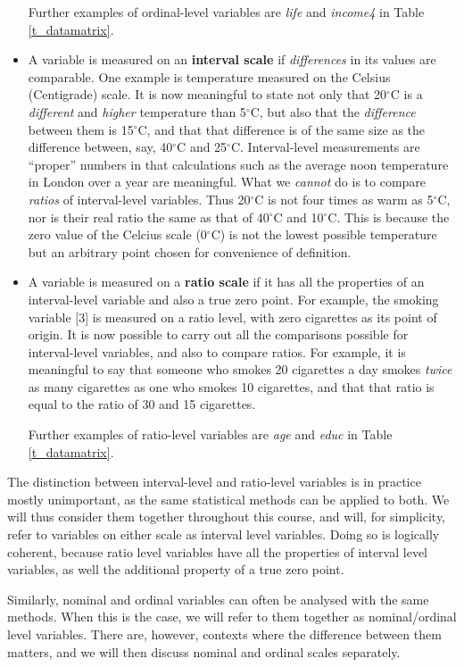\begin{itemize}
Further examples of ordinal-level variables are
\emph{life} and \emph{income4} in Table \ref{t_datamatrix}.
\item
A variable is measured on an
\textbf{interval scale} if \emph{differences} in its values are
comparable. One example is temperature measured on the Celsius
(Centigrade) scale. It is now meaningful to state not only that
20$^{\circ}$C is a \emph{different} and \emph{higher} temperature than
5$^{\circ}$C, but also that the \emph{difference} between them is
15$^{\circ}$C, and that that difference is of the same size as the
difference between, say, 40$^{\circ}$C and 25$^{\circ}$C. Interval-level
measurements are ``proper'' numbers in that calculations such as the
average noon temperature in London over a year are meaningful. What we
\emph{cannot} do is to compare \emph{ratios} of interval-level
variables. Thus 20$^{\circ}$C is not four times as warm as 5$^{\circ}$C,
nor is their real ratio the same as that of 40$^{\circ}$C and
10$^{\circ}$C. This is because the zero value of the Celcius scale
(0$^{\circ}$C) is not the lowest possible temperature but
an arbitrary point chosen for convenience of definition.
\item
A variable is measured on a \textbf{ratio scale} if it has all the
properties of an interval-level variable and also a true zero point.
For example, the smoking variable [3] is measured on a ratio level,
with zero cigarettes as its point of origin.
It is now possible to carry out all the comparisons possible for
interval-level variables, and also to compare ratios. For
example, it is meaningful to say that someone who smokes 20 cigarettes
a day smokes \emph{twice} as many cigarettes as one who smokes 10
cigarettes, and that that ratio is equal to the ratio of 30 and 15
cigarettes.

Further examples of ratio-level variables are \emph{age} and \emph{educ}
in Table \ref{t_datamatrix}.
\end{itemize}
The distinction between interval-level and ratio-level variables is in
practice mostly unimportant, as the same statistical methods can be
applied to both. We will thus consider them together throughout this
course, and will, for simplicity, refer to variables on either scale
as interval level
variables.
Doing so is logically coherent, because ratio level variables
have all the properties of interval level variables, as well the
additional property of a true zero point.

Similarly, nominal and ordinal variables can often be analysed with the
same methods. When this is the case, we will refer to them together as
nominal/ordinal level variables. There are, however, contexts where the
difference between them matters, and we will then discuss nominal and
ordinal scales separately.

